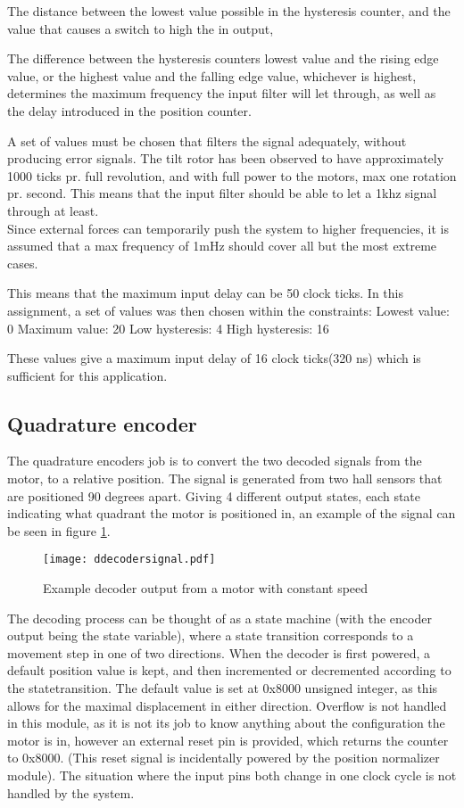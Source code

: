 The distance between the lowest value possible in the hysteresis counter, and the value that causes a switch to high the in output,

The difference between the hysteresis counters lowest value and the rising edge value, or the highest value and the falling edge value, whichever is highest, determines the maximum frequency the input filter will let through, as well as the delay introduced in the position counter.

A set of values must be chosen that filters the signal adequately, without producing error signals. The tilt rotor has been observed to have approximately 1000 ticks pr. full revolution, and with full power to the motors, max one rotation pr. second.
This means that the input filter should be able to let a 1khz signal through at least. \\ 
Since external forces can temporarily push the system to higher frequencies, it is assumed that a max frequency of 1mHz should cover all but the most extreme cases.

This means that the maximum input delay can be 50 clock ticks.
In this assignment, a set of values was then chosen within the constraints: 
Lowest value: 0
Maximum value: 20
Low hysteresis: 4
High hysteresis: 16

These values give a maximum input delay of 16 clock ticks(320 ns) which is sufficient for this application.

\subsection{Quadrature encoder}
The quadrature encoders job is to convert the two decoded signals from the motor, to a relative position. The signal is generated from two hall sensors that are positioned 90 degrees apart. Giving 4 different output states, each state indicating what quadrant the motor is positioned in, an example of the signal can be seen in figure \ref{fig:decodersignal}.
\begin{figure}[htb]
\texttt{[image: ddecodersignal.pdf]}
\caption{Example decoder output from a motor with constant speed}
\label{fig:decodersignal}
\end{figure}
The decoding process can be thought of as a state machine (with the encoder output being the state variable), where a state transition corresponds to a movement step in one of two directions.
When the decoder is first powered, a default position value is kept, and then incremented or decremented according to the statetransition. The default value is set at 0x8000 unsigned integer, as this allows for the maximal displacement in either direction. 
Overflow is not handled in this module, as it is not its job to know anything about the configuration the motor is in, however an external reset pin is provided, which returns the counter to 0x8000. (This reset signal is incidentally powered by the position normalizer module).
The situation where the input pins both change in one clock cycle is not handled by the system.


